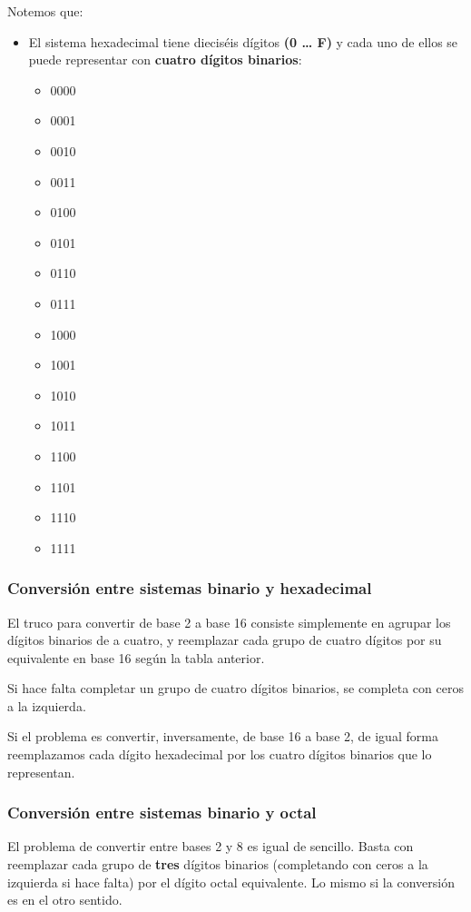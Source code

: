 \documentclass[spanish,a4paper,]{article}
\providecommand{\tightlist}{%
  \setlength{\itemsep}{0pt}\setlength{\parskip}{0pt}}
\begin{document}
Notemos que:

\begin{itemize}
\tightlist
\item
  El sistema hexadecimal tiene dieciséis dígitos \textbf{(0 \ldots{} F)}
  y cada uno de ellos se puede representar con \textbf{cuatro dígitos
  binarios}:

  \begin{itemize}
  \tightlist
  \item
    0000
  \item
    0001
  \item
    0010
  \item
    0011
  \item
    0100
  \item
    0101
  \item
    0110
  \item
    0111
  \item
    1000
  \item
    1001
  \item
    1010
  \item
    1011
  \item
    1100
  \item
    1101
  \item
    1110
  \item
    1111
  \end{itemize}
\end{itemize}

\hypertarget{conversiuxf3n-entre-sistemas-binario-y-hexadecimal}{%
\subsubsection{Conversión entre sistemas binario y
hexadecimal}\label{conversiuxf3n-entre-sistemas-binario-y-hexadecimal}}

El truco para convertir de base 2 a base 16 consiste simplemente en
agrupar los dígitos binarios de a cuatro, y reemplazar cada grupo de
cuatro dígitos por su equivalente en base 16 según la tabla anterior.

Si hace falta completar un grupo de cuatro dígitos binarios, se completa
con ceros a la izquierda.

Si el problema es convertir, inversamente, de base 16 a base 2, de igual
forma reemplazamos cada dígito hexadecimal por los cuatro dígitos
binarios que lo representan.

\hypertarget{conversiuxf3n-entre-sistemas-binario-y-octal}{%
\subsubsection{Conversión entre sistemas binario y
octal}\label{conversiuxf3n-entre-sistemas-binario-y-octal}}

El problema de convertir entre bases 2 y 8 es igual de sencillo. Basta
con reemplazar cada grupo de \textbf{tres} dígitos binarios (completando
con ceros a la izquierda si hace falta) por el dígito octal equivalente.
Lo mismo si la conversión es en el otro sentido.
\end{document}
